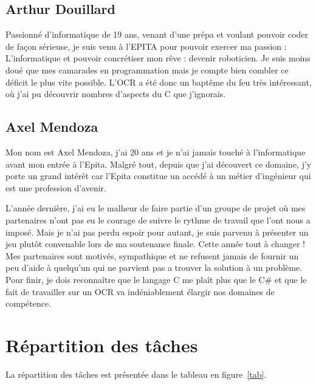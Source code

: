 \documentclass[11pt]{report}
\begin{document}
\subsection{Arthur Douillard}

Passionné d’informatique de 19 ans, venant d’une prépa et voulant pouvoir coder de façon sérieuse, je suis venu à l’EPITA pour pouvoir exercer ma passion : L’informatique et pouvoir concrétiser mon rêve : devenir roboticien. Je suis moins doué que mes camarades en programmation mais je compte bien combler ce déficit le plus vite possible. L’OCR a été donc un baptême du feu très intéressant, où j’ai pu découvrir nombres d’aspects du C que j’ignorais.

\subsection{Axel Mendoza}

Mon nom est Axel Mendoza, j'ai 20 ans et je n'ai jamais touché à l'informatique avant mon entrée à l'Epita. Malgré tout, depuis que j'ai découvert ce domaine, j'y porte un grand intérêt car l'Epita constitue un accédé à un  métier d'ingénieur qui est une profession d'avenir. 

L'année dernière, j'ai eu le malheur de faire partie d'un groupe de projet où mes partenaires n'ont pas eu le courage de suivre le rythme de travail que l'ont nous a imposé. Mais je n'ai pas perdu espoir pour autant, je suis parvenu à présenter un jeu plutôt convenable lors de ma soutenance finale. Cette année tout à changer ! Mes partenaires sont motivés, sympathique et ne refusent jamais de fournir un peu d'aide à quelqu'un qui ne parvient pas a trouver la solution à un problème. Pour finir, je dois reconnaître que le langage C me plaît plus que le C\# et que le fait de travailler sur un OCR va indéniablement élargir nos domaines de compétence.

\section{Répartition des tâches}

La répartition des tâches est présentée dans le tableau en figure~\ref{tab}.

\end{document}
